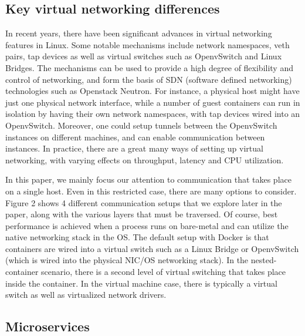 \documentclass[conference]{IEEEtran}
\begin{document}
\subsection{Key virtual networking differences}

In recent years, there have been significant advances
in virtual networking features in Linux. Some notable mechanisms
include network namespaces, veth pairs, tap devices as well as virtual
switches such as OpenvSwitch and Linux Bridges. The mechanisms can be
used to provide a high degree of flexibility and control of networking, and form 
the basis of SDN (software defined networking) technologies such as Openstack 
Neutron. For instance, a physical host might have just one physical network 
interface, while a number of guest containers can run in isolation by having 
their own network namespaces, with tap devices wired into an OpenvSwitch. 
Moreover, one could setup tunnels between the OpenvSwitch instances on different 
machines, and can enable communication between instances. In practice, there are 
a great many ways of setting up virtual networking, with varying effects on 
throughput, latency and CPU utilization.

In this paper, we mainly focus our attention to communication that takes place
on a single host. Even in this restricted case, there are many options to 
consider. Figure 2 shows 4 different communication setups that we explore later 
in the paper, along with the various layers that must be traversed. Of course, 
best performance is achieved when a process runs on bare-metal and can utilize 
the native networking stack in the OS. The default setup with Docker is that 
containers are wired into a virtual switch such as a Linux Bridge or OpenvSwitch 
(which is wired into the physical NIC/OS networking stack). In the 
nested-container scenario, there is a second level of virtual switching that 
takes place inside the container. In the virtual machine case, there is 
typically a virtual switch as well as virtualized network drivers.


\subsection{Microservices}
\end{document}
